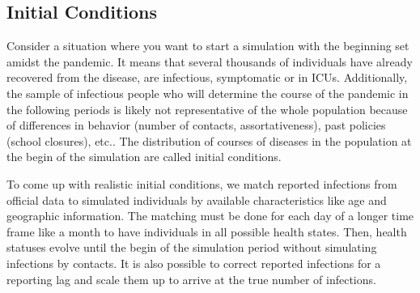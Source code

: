 \subsection{Initial Conditions} %
\label{sub:initial_conditions}

Consider a situation where you want to start a simulation with the beginning set amidst the pandemic. It means that several thousands of individuals have already recovered from the disease, are infectious, symptomatic or in ICUs. Additionally, the sample of infectious people who will determine the course of the pandemic in the following periods is likely not representative of the whole population because of differences in behavior (number of contacts, assortativeness), past policies (school closures), etc.. The distribution of courses of diseases in the population at the begin of the simulation are called initial conditions.

To come up with realistic initial conditions, we match reported infections from official data to simulated individuals by available characteristics like age and geographic information. The matching must be done for each day of a longer time frame like a month to have individuals in all possible health states. Then, health statuses evolve until the begin of the simulation period without simulating infections by contacts. It is also possible to correct reported infections for a reporting lag and scale them up to arrive at the true number of infections.

